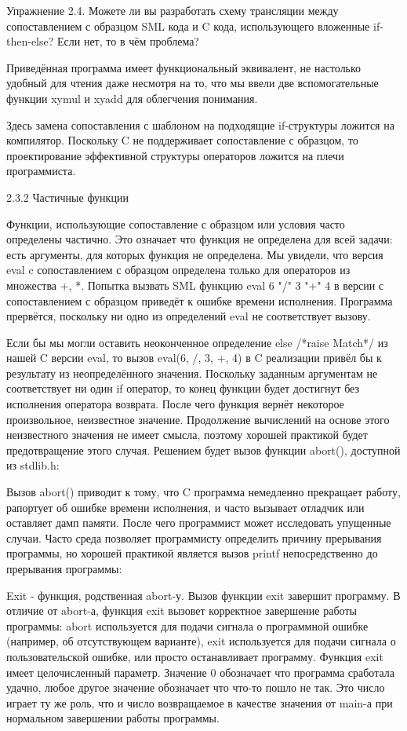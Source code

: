 Упражнение 2.4. Можете ли вы разработать схему трансляции между сопоставлением с образцом SML кода и C кода, использующего вложенные if-then-else? Если нет, то в чём проблема?

Приведённая программа имеет функциональный эквивалент, не настолько удобный для чтения даже несмотря на то, что мы ввели две вспомогательные функции xymul и xyadd для облегчения понимания.

Здесь замена сопоставления с шаблоном на подходящие if-структуры ложится на компилятор. Поскольку C не поддерживает сопоставление с образцом, то проектирование эффективной структуры операторов ложится на плечи программиста.

2.3.2 Частичные функции

Функции, использующие сопоставление с образцом или условия часто определены частично. Это означает что функция не определена для всей задачи: есть аргументы, для которых функция не определена. Мы увидели, что версия eval c сопоставлением с образцом определена только для операторов из множества {+, *}. Попытка вызвать SML функцию eval 6 "/" 3 "+" 4 в версии с сопоставлением с образцом приведёт к ошибке времени исполнения. Программа прервётся, поскольку ни одно из определений eval не соответствует вызову.

Если бы мы могли оставить неоконченное определение else /*raise Match*/ из нашей C версии eval, то вызов eval(6, /, 3, +, 4) в C реализации привёл бы к результату из неопределённого значения. Поскольку заданным аргументам не соответствует ни один if оператор, то конец функции будет достигнут без исполнения оператора возврата. После чего функция вернёт некоторое произвольное, неизвестное значение. Продолжение вычислений на основе этого неизвестного значения не имеет смысла, поэтому хорошей практикой будет предотвращение этого случая. Решением будет вызов функции abort(), доступной из stdlib.h:

Вызов abort() приводит к тому, что C программа немедленно прекращает работу, рапортует об ошибке времени исполнения, и часто вызывает отладчик или оставляет дамп памяти. После чего программист может исследовать упущенные случаи. Часто среда позволяет программисту определить причину прерывания программы, но хорошей практикой является вызов printf непосредственно до прерывания программы:

Exit - функция, родственная abort-у. Вызов функции exit завершит программу. В отличие от abort-а, функция exit вызовет корректное завершение работы программы: abort используется для подачи сигнала о программной ошибке (например, об отсутствующем варианте), exit используется для подачи сигнала о пользовательской ошибке, или просто останавливает программу. Функция exit имеет целочисленный параметр. Значение 0 обозначает что программа сработала удачно, любое другое значение обозначает что что-то пошло не так. Это число играет ту же роль, что и число возвращаемое в качестве значения от main-а при нормальном завершении работы программы.

